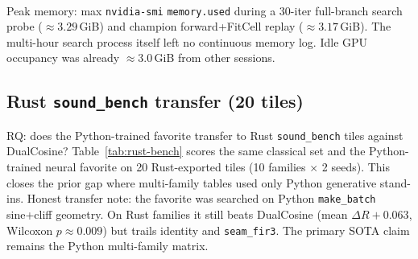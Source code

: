 \begin{table}[t]
  \centering
  \caption{\textbf{Compute budget and wall-clock breakdown for the reported meta-search freeze.} Details GPU hours, batch evaluations, and energy requirements on an NVIDIA RTX~3090 (PyTorch $2.6$+cu124, search seed \texttt{1902771841}). The hybrid controller explores 6,922 candidate architecture evaluations within 14.8 wall-clock hours, demonstrating sample-efficient convergence compared to pure evolutionary search.}
  \label{tab:compute}
  \setlength{\tabcolsep}{3pt}
  \\[0.4em]
  {\footnotesize Peak memory: max \texttt{nvidia-smi} \texttt{memory.used} during a 30-iter full-branch search probe ($\approx 3.29$\,GiB) and champion forward{+}FitCell replay ($\approx 3.17$\,GiB). The multi-hour search process itself left no continuous memory log. Idle GPU occupancy was already $\approx 3.0$\,GiB from other sessions.}
\end{table}

\subsection{Rust \texttt{sound\_bench} transfer (20 tiles)}
\label{sec:rust-bench}

RQ: does the Python-trained favorite transfer to Rust \texttt{sound\_bench} tiles against DualCosine?
Table~\ref{tab:rust-bench} scores the same classical set and the Python-trained neural favorite on 20 Rust-exported tiles (10 families $\times$ 2 seeds).
This closes the prior gap where multi-family tables used only Python generative stand-ins.
Honest transfer note: the favorite was searched on Python \texttt{make\_batch} sine{+}cliff geometry. On Rust families it still beats DualCosine (mean $\Delta R{+}0.063$, Wilcoxon $p{\approx}0.009$) but trails identity and \texttt{seam\_fir3}. The primary SOTA claim remains the Python multi-family matrix.

